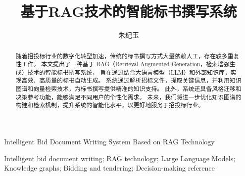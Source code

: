 \documentclass{xmu}
\begin{document}
\print


\design


\title{基于RAG技术的智能标书撰写系统}
{Intelligent Bid Document Writing System Based on RAG Technology}

\author{朱纪玉}



\subject{网络空间安全}





{Intelligent bid document writing; RAG technology; Large Language Models; Knowledge graphs; Bidding and tendering; Decision-making reference}

\maketitle


\begin{abstract}
随着招投标行业的数字化转型加速，传统的标书撰写方式大量依赖人工，存在较多重复性工作。
本文提出了一种基于 RAG（Retrieval-Augmented Generation，检索增强生成）技术的智能标书撰写系统，
旨在通过结合大语言模型（LLM）和外部知识库，实现高效、高质量的标书自动生成。
系统通过解析招标文件，提取关键信息，并利用知识图谱和向量检索技术，为标书撰写提供精准的知识支持。
此外，系统还具备风格迁移和决策参考功能，能够满足不同用户的个性化需求。
未来，我们将进一步优化知识图谱的构建和检索机制，提升系统的智能化水平，以更好地服务于招投标行业。
\end{abstract}
\end{document}
